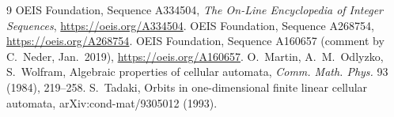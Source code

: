 \documentclass[11pt]{article}
\theoremstyle{definition}
\theoremstyle{remark}
\begin{document}
\begin{thebibliography}{9}
 OEIS Foundation, Sequence A334504, \emph{The On-Line
  Encyclopedia of Integer Sequences}, \url{https://oeis.org/A334504}.
 OEIS Foundation, Sequence A268754,
  \url{https://oeis.org/A268754}.
 OEIS Foundation, Sequence A160657 (comment by
  C.~Neder, Jan.~2019), \url{https://oeis.org/A160657}.
 O.~Martin, A.~M.~Odlyzko, S.~Wolfram, Algebraic properties of
  cellular automata, \emph{Comm. Math. Phys.} 93 (1984), 219--258.
 S.~Tadaki, Orbits in one-dimensional finite linear cellular
  automata, arXiv:cond-mat/9305012 (1993).
\end{thebibliography}
\end{document}
